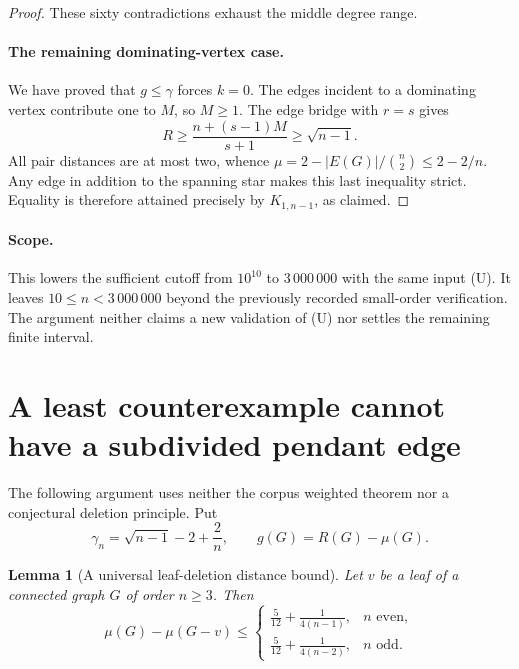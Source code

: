 \documentclass[11pt,a4paper]{article}
\newtheorem{lemma}[theorem]{Lemma}
\theoremstyle{remark}
\numberwithin{equation}{section}
\begin{document}
\begin{proof}
These sixty contradictions exhaust the middle degree range.

\paragraph{The remaining dominating-vertex case.}
We have proved that $g\le\gamma$ forces $k=0$. The edges incident to a
dominating vertex contribute one to $M$, so $M\ge1$. The edge bridge
with $r=s$ gives
\[
 R\ge\frac{n+(s-1)M}{s+1}\ge\sqrt{n-1}.
\]
All pair distances are at most two, whence
$\mu=2-|E(G)|/\binom n2\le2-2/n$. Any edge in addition to the spanning
star makes this last inequality strict. Equality is therefore attained
precisely by $K_{1,n-1}$, as claimed.
\end{proof}

\paragraph{Scope.}
This lowers the sufficient cutoff from $10^{10}$ to $3\,000\,000$ with
the same input \textup{(U)}. It leaves $10\le n<3\,000\,000$ beyond
the previously recorded small-order verification. The argument neither
claims a new validation of \textup{(U)} nor settles the remaining
finite interval.


\section{A least counterexample cannot have a subdivided pendant edge}
\label{sec:ch-leaf-support-two}

The following argument uses neither the corpus weighted theorem nor a
conjectural deletion principle. Put
\[
 \gamma_n=\sqrt{n-1}-2+\frac2n,\qquad g(G)=R(G)-\mu(G).
\]

\begin{lemma}[A universal leaf-deletion distance bound]
\label{lem:ch-leaf-distance-increment}
Let \(v\) be a leaf of a connected graph \(G\) of order \(n\ge3\). Then
\[
 \mu(G)-\mu(G-v)\le
 \begin{cases}
  \displaystyle\frac5{12}+\frac1{4(n-1)},&n\text{ even},\\[4pt]
  \displaystyle\frac5{12}+\frac1{4(n-2)},&n\text{ odd}.
 \end{cases}
\]
\end{lemma}
\end{document}
